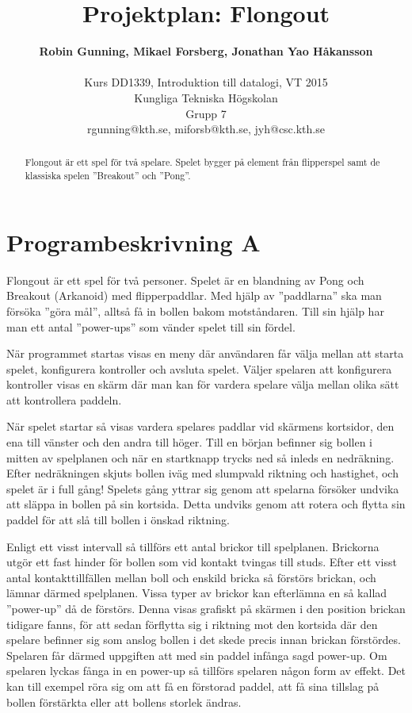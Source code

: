 \documentclass[a4paper,11pt]{article}
\title{\textbf{Projektplan: Flongout}}
\author{\textbf{Robin Gunning, Mikael Forsberg, Jonathan Yao Håkansson}\\ \\ Kurs DD1339, Introduktion till datalogi, VT 2015\\ Kungliga Tekniska Högskolan\\ Grupp 7\\ rgunning@kth.se, miforsb@kth.se, jyh@csc.kth.se}
\begin{document}
\maketitle

\begin{abstract}
\noindent
Flongout är ett spel för två spelare. Spelet bygger på element från
flipperspel samt de klassiska spelen ''Breakout'' och ''Pong''.
\end{abstract}
\newpage

\tableofcontents
\newpage
{}

\section{Programbeskrivning A}
Flongout är ett spel för två personer. Spelet är en blandning av Pong och Breakout (Arkanoid) med flipperpaddlar.
Med hjälp av ''paddlarna'' ska man försöka ''göra mål'', alltså få in bollen bakom motståndaren. Till sin hjälp har man ett antal ''power-ups''
som vänder spelet till sin fördel.

\bigskip
\noindent 
När programmet startas visas en meny där användaren får välja mellan att starta spelet, konfigurera kontroller och avsluta spelet.
Väljer spelaren att konfigurera kontroller visas en skärm där man kan för vardera spelare välja mellan olika sätt att kontrollera paddeln.

\bigskip
\noindent
När spelet startar så visas vardera spelares paddlar vid skärmens kortsidor, den ena till vänster och den andra till höger.
Till en början befinner sig bollen i mitten av spelplanen och när en startknapp trycks ned så inleds en nedräkning. Efter nedräkningen skjuts bollen iväg med slumpvald riktning och hastighet, och spelet är i full gång!
Spelets gång yttrar sig genom att spelarna försöker undvika att släppa in bollen på sin kortsida. Detta undviks genom att rotera och flytta sin paddel för att slå till bollen i önskad riktning.

Enligt ett visst intervall så tillförs ett antal brickor till spelplanen.
Brickorna utgör ett fast hinder för bollen som vid kontakt tvingas till studs. Efter ett visst antal
kontakttillfällen mellan boll och enskild bricka så förstörs brickan, och lämnar därmed spelplanen. Vissa
typer av brickor kan efterlämna en så kallad ''power-up'' då de förstörs. Denna visas grafiskt på skärmen i
den position brickan tidigare fanns, för att sedan förflytta sig i riktning mot den kortsida där den
spelare befinner sig som anslog bollen i det skede precis innan brickan förstördes. Spelaren får
därmed uppgiften att med sin paddel infånga sagd power-up. Om spelaren lyckas fånga in en power-up
så tillförs spelaren någon form av effekt. Det kan till exempel röra sig om att få
en förstorad paddel, att få sina tillslag på bollen förstärkta eller att bollens storlek ändras.
\end{document}

